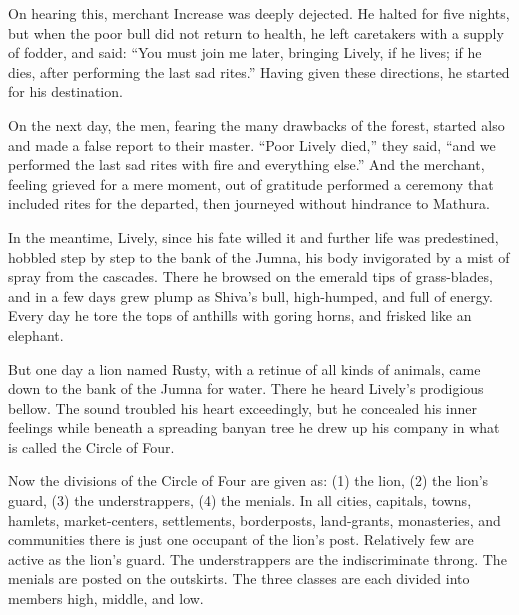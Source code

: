 \documentclass{article}
\begin{document}
On hearing this, merchant Increase was deeply dejected. He halted
for five nights, but when the poor bull did not return to health,
he left caretakers with a supply of fodder, and said:
``You must join me later, bringing Lively, if he lives; if he dies, after performing the last sad rites.''
Having given these directions, he started for his destination.

On the next day, the men, fearing the many drawbacks of the forest,
started also and made a false report to their master.
``Poor Lively died,'' they said,
``and we performed the last sad rites with fire and everything else.''
And the merchant, feeling grieved for a mere moment, out of
gratitude performed a ceremony that included rites for the
departed, then journeyed without hindrance to Mathura.

In the meantime, Lively, since his fate willed it and further life
was predestined, hobbled step by step to the bank of the Jumna, his
body invigorated by a mist of spray from the cascades. There he
browsed on the emerald tips of grass-blades, and in a few days grew
plump as Shiva's bull, high-humped, and full of energy. Every day
he tore the tops of anthills with goring horns, and frisked like an
elephant.

But one day a lion named Rusty, with a retinue of all kinds of
animals, came down to the bank of the Jumna for water. There he
heard Lively's prodigious bellow. The sound troubled his heart
exceedingly, but he concealed his inner feelings while beneath a
spreading banyan tree he drew up his company in what is called the
Circle of Four.

Now the divisions of the Circle of Four are given as: (1) the lion,
(2) the lion's guard, (3) the understrappers, (4) the menials. In
all cities, capitals, towns, hamlets, market-centers, settlements,
borderposts, land-grants, monasteries, and communities there is
just one occupant of the lion's post. Relatively few are active as
the lion's guard. The understrappers are the indiscriminate throng.
The menials are posted on the outskirts. The three classes are each
divided into members high, middle, and low.
\end{document}
